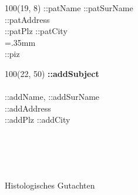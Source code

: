 \documentclass{scrreprt}
\begin{document}
%



\baselineskip10pt

\textblockorigin{0in}{0in}
\setlength{\TPHorizModule}{1mm}
\setlength{\TPVertModule}{1mm}


{
\scriptsize
\begin{textblock}{100}(19, 8) 
\noindent ::patName ::patSurName\\
::patAddress\\
::patPlz ::patCity\\
\X=.35mm        
\barheight=1cm 
\\
::piz\\
\end{textblock}
}

{
\begin{textblock}{100}(22, 50) 
\noindent 
\textbf{::addSubject} \\\\
::addName, ::addSurName\\
::addAddress\\
::addPlz ::addCity\\
\end{textblock}
}

~\\
\vspace{5.0cm}\\
\noindent\makebox[\linewidth]{\rule{\linewidth}{0.4pt}}\\\\
{\huge Histologisches Gutachten} \\
\end{document}
